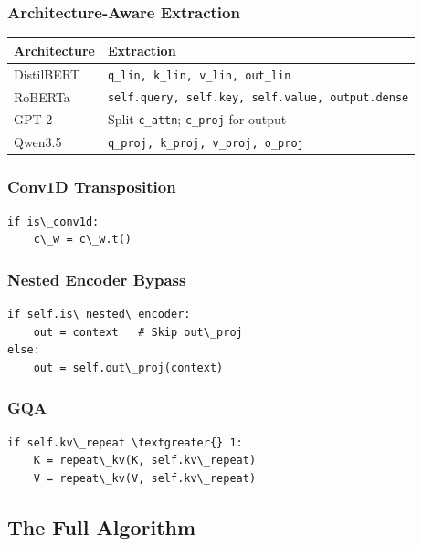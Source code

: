 \subsubsection{Architecture-Aware Extraction}

\begin{table}[H]
\centering
\small
\begin{tabular}{ll}
\toprule
\textbf{Architecture} & \textbf{Extraction} \\
\midrule
DistilBERT & \texttt{q\_lin, k\_lin, v\_lin, out\_lin} \\
RoBERTa & \texttt{self.query, self.key, self.value, output.dense} \\
GPT-2 & Split \texttt{c\_attn}; \texttt{c\_proj} for output \\
Qwen3.5 & \texttt{q\_proj, k\_proj, v\_proj, o\_proj} \\
\bottomrule
\end{tabular}
\end{table}

\subsubsection{Conv1D Transposition}

\begin{lstlisting}
if is\_conv1d:
    c\_w = c\_w.t()
\end{lstlisting}

\subsubsection{Nested Encoder Bypass}

\begin{lstlisting}
if self.is\_nested\_encoder:
    out = context   # Skip out\_proj
else:
    out = self.out\_proj(context)
\end{lstlisting}

\subsubsection{GQA}

\begin{lstlisting}
if self.kv\_repeat \textgreater{} 1:
    K = repeat\_kv(K, self.kv\_repeat)
    V = repeat\_kv(V, self.kv\_repeat)
\end{lstlisting}

\subsection{The Full Algorithm}

